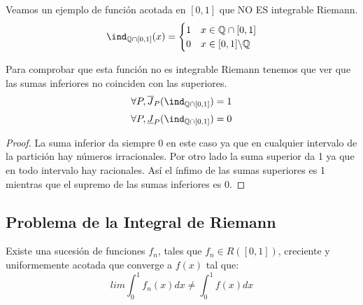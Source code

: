 \documentclass{apuntes}
\begin{document}
\begin{example}
Veamos un ejemplo de función acotada en $[ 0,1]$ que NO ES integrable Riemann.
\[
 \ind_{\mathbb{Q}  \cap  [0,1]} (x) =
  \begin{cases}
   1 &  x \in \mathbb{Q} \cap [0,1] \\
   0       &  x \in [0,1] \backslash \mathbb{Q}
  \end{cases}
\]

Para comprobar que esta función no es integrable Riemann tenemos que ver que las sumas inferiores no coinciden con las superiores.
\[\forall P, \overline{J}_P(\ind_{\mathbb{Q} \cap [0,1]}) = 1\]
\[\forall P, \underline{J}_P(	\ind_{\mathbb{Q} \cap [0,1]}) = 0\]


\begin{proof}
La suma inferior da siempre 0 en este caso ya que en cualquier intervalo de la partición hay números irracionales. Por otro lado la suma superior da 1 ya que en todo intervalo hay racionales. Así el ínfimo de las sumas superiores es 1 mientras que el supremo de las sumas inferiores es 0.
\end{proof}
\end{example}

\subsection{Problema de la Integral de Riemann}
Existe una sucesión de funciones $f_n$, tales que $f_n\in R([ 0, 1 ])$, creciente y uniformemente acotada que converge a $f(x)$ tal que:
\[lim \int_0^1 f_n(x) dx \neq \int_0^1 f(x) dx\]
\end{document}
